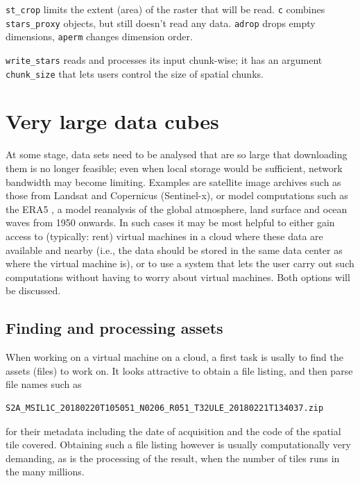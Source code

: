 \documentclass[]{book}
\begin{document}
\texttt{st\_crop} limits the extent (area) of the raster that will be
read. \texttt{c} combines \texttt{stars\_proxy} objects, but still doesn't read
any data. \texttt{adrop} drops empty dimensions, \texttt{aperm} changes dimension
order.

\texttt{write\_stars} reads and processes its input chunk-wise; it has an
argument \texttt{chunk\_size} that lets users control the size of spatial
chunks.

\hypertarget{very-large-data-cubes}{%
\section{Very large data cubes}\label{very-large-data-cubes}}

At some stage, data sets need to be analysed that are so large that
downloading them is no longer feasible; even when local storage would
be sufficient, network bandwidth may become limiting. Examples are
satellite image archives such as those from Landsat and Copernicus
(Sentinel-x), or model computations such as the ERA5 \citep{era5}, a
model reanalysis of the global atmosphere, land surface and ocean
waves from 1950 onwards. In such cases it may be most helpful to
either gain access to (typically: rent) virtual machines in a cloud
where these data are available and nearby (i.e., the data should be
stored in the same data center as where the virtual machine is),
or to use a system that lets the user carry out such computations
without having to worry about virtual machines. Both options will
be discussed.

\hypertarget{finding-and-processing-assets}{%
\subsection{Finding and processing assets}\label{finding-and-processing-assets}}

When working on a virtual machine on a cloud, a first task is usally
to find the assets (files) to work on. It looks attractive to obtain
a file listing, and then parse file names such as

\begin{verbatim}
S2A_MSIL1C_20180220T105051_N0206_R051_T32ULE_20180221T134037.zip
\end{verbatim}

for their metadata including the date of acquisition and the code
of the spatial tile covered. Obtaining such a file listing however
is usually computationally very demanding, as is the processing of
the result, when the number of tiles runs in the many millions.
\end{document}
